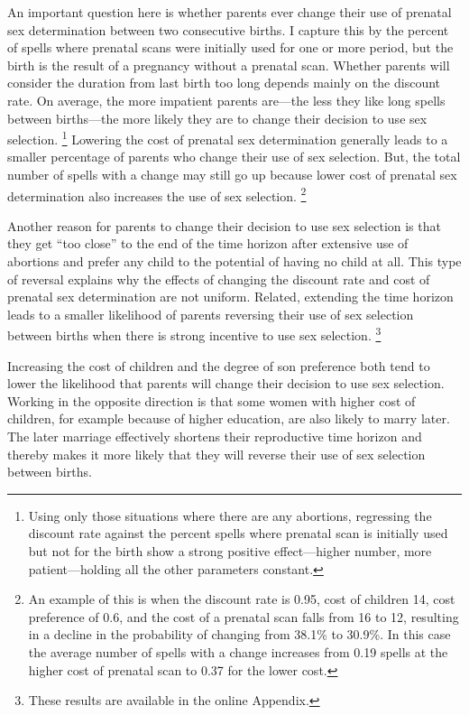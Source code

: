 \documentclass[12pt,letterpaper]{article}
\begin{document}
An important question here is whether parents ever
change their use of prenatal sex determination between
two consecutive births.
I capture this by the percent of spells where prenatal
scans were initially used for one or more period, but the birth
is the result of a pregnancy without a prenatal scan.
Whether parents will consider the duration from last birth too long 
depends mainly on the discount rate.
On average, the more impatient parents are---the less they
like long spells between births---the more likely they are to
change their decision to use sex selection.%
\footnote{
Using only those situations where there are any abortions,
regressing the discount rate against the percent spells where
prenatal scan is initially used but not for the birth show
a strong positive effect---higher number, more patient---holding
all the other parameters constant.
}
Lowering the cost of prenatal sex determination generally leads to 
a smaller percentage of parents who change their use of sex selection.
But, the total number of spells with a change may still
go up because lower cost of prenatal sex determination also
increases the use of sex selection.%
\footnote{
An example of this is when the discount rate is 0.95, cost of
children 14, cost preference of 0.6, and the cost of a prenatal scan falls 
from 16 to 12, resulting in a decline in the probability of changing 
from 38.1\% to 30.9\%.
In this case the average number of spells with a change increases
from 0.19 spells at the higher cost of prenatal scan 
to 0.37 for the lower cost.
}

Another reason for parents to change their decision to use sex
selection is that they get ``too close'' to the end of the time
horizon after extensive use of abortions and prefer any child to 
the potential of having no child at all.
This type of reversal explains why the effects of changing the discount 
rate and cost of prenatal sex determination are not uniform.
Related, extending the time horizon leads to a smaller likelihood of parents 
reversing their use of sex selection between births when
there is strong incentive to use sex selection.%
\footnote{
These results are available in the online Appendix.
}

Increasing the cost of children and the degree of son preference
both tend to lower the likelihood that parents will change their
decision to use sex selection.
Working in the opposite direction is that some women with higher cost
of children, for example because of higher education, are also likely 
to marry later.
The later marriage effectively shortens their reproductive time horizon
and thereby makes it more likely that they will reverse their use of 
sex selection between births.
\end{document}
